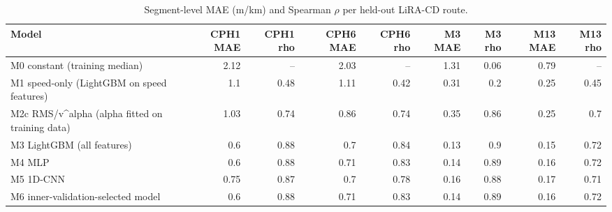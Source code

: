 \begin{table}[!htbp]
\centering
\footnotesize
\caption{Segment-level MAE (m/km) and Spearman $\rho$ per held-out LiRA-CD route.}
\label{tab:perroute}
\begin{adjustbox}{max width=\columnwidth}
\begin{tabular}{lrrrrrrrr}
\toprule
\textbf{Model} & \textbf{CPH1 MAE} & \textbf{CPH1 rho} & \textbf{CPH6 MAE} & \textbf{CPH6 rho} & \textbf{M3 MAE} & \textbf{M3 rho} & \textbf{M13 MAE} & \textbf{M13 rho} \\
\midrule
M0 constant (training median) & 2.12 & -- & 2.03 & -- & 1.31 & 0.06 & 0.79 & -- \\
M1 speed-only (LightGBM on speed features) & 1.1 & 0.48 & 1.11 & 0.42 & 0.31 & 0.2 & 0.25 & 0.45 \\
M2c RMS/v\textasciicircum{}alpha (alpha fitted on training data) & 1.03 & 0.74 & 0.86 & 0.74 & 0.35 & 0.86 & 0.25 & 0.7 \\
M3 LightGBM (all features) & 0.6 & 0.88 & 0.7 & 0.84 & 0.13 & 0.9 & 0.15 & 0.72 \\
M4 MLP & 0.6 & 0.88 & 0.71 & 0.83 & 0.14 & 0.89 & 0.16 & 0.72 \\
M5 1D-CNN & 0.75 & 0.87 & 0.7 & 0.78 & 0.16 & 0.88 & 0.17 & 0.71 \\
M6 inner-validation-selected model & 0.6 & 0.88 & 0.71 & 0.83 & 0.14 & 0.89 & 0.16 & 0.72 \\
\bottomrule
\end{tabular}
\end{adjustbox}
\end{table}
